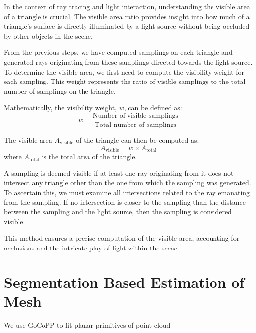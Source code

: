 \documentclass[11pt, a4paper,oneside,chapterprefix=false]{scrbook}
\begin{document}
In the context of ray tracing and light interaction, understanding the visible area of a triangle is crucial. The visible area ratio provides insight into how much of a triangle's surface is directly illuminated by a light source without being occluded by other objects in the scene.

\vspace{10pt}

From the previous steps, we have computed samplings on each triangle and generated rays originating from these samplings directed towards the light source. To determine the visible area, we first need to compute the visibility weight for each sampling. This weight represents the ratio of visible samplings to the total number of samplings on the triangle.

\vspace{10pt}

Mathematically, the visibility weight, \( w \), can be defined as:
\begin{equation}
    w = \frac{\text{Number of visible samplings}}{\text{Total number of samplings}}
\end{equation}

The visible area \( A_{\text{visible}} \) of the triangle can then be computed as:
\begin{equation}
    A_{\text{visible}} = w \times A_{\text{total}}
\end{equation}
where \( A_{\text{total}} \) is the total area of the triangle.

A sampling is deemed visible if at least one ray originating from it does not intersect any triangle other than the one from which the sampling was generated. To ascertain this, we must examine all intersections related to the ray emanating from the sampling. If no intersection is closer to the sampling than the distance between the sampling and the light source, then the sampling is considered visible.

\vspace{10pt}

This method ensures a precise computation of the visible area, accounting for occlusions and the intricate play of light within the scene.
 
\section{Segmentation Based Estimation of Mesh} \label{sec:segmentation mesh estimation}

We use GoCoPP to fit planar primitives of point cloud.
\end{document}
